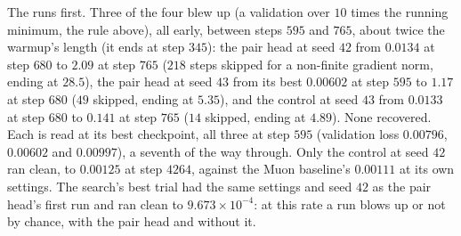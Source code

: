 \documentclass[11pt]{article}
\begin{document}
\begin{itemize}
    The runs first. Three of the four blew up (a validation over $10$ times the running minimum, the rule above), all
    early, between steps $595$ and $765$, about twice the warmup's length (it ends at step $345$): the pair head at seed $42$ from $0.0134$ at step $680$ to $2.09$ at
    step $765$ ($218$ steps skipped for a non-finite gradient norm, ending at $28.5$), the pair head at seed $43$ from
    its best $0.00602$ at step $595$ to $1.17$ at step $680$ ($49$ skipped, ending at $5.35$), and the control at seed
    $43$ from $0.0133$ at step $680$ to $0.141$ at step $765$ ($14$ skipped, ending at $4.89$). None recovered. Each is
    read at its best checkpoint, all three at step $595$ (validation loss $0.00796$, $0.00602$ and $0.00997$), a
    seventh of the way through. Only the control at seed $42$ ran clean, to $0.00125$ at step $4264$, against the
    Muon baseline's $0.00111$ at its own settings.
    The search's best trial had the same settings and seed $42$ as the pair head's first run and ran clean to
    $9.673\times10^{-4}$: at this rate a run blows up or not by chance, with the pair head and without it.

\end{itemize}
\end{document}
